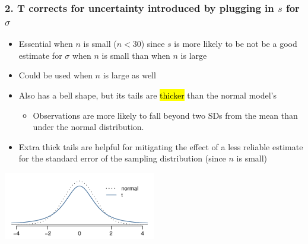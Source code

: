\documentclass[slidestop,compress,mathserif,12pt,t,professionalfonts,xcolor=table]{beamer}
\begin{document}
\begin{frame}
\frametitle{2. T corrects for uncertainty introduced by plugging in $s$ for $\sigma$}

\begin{itemize}

\item Essential when $n$ is small ($n < 30$) since $s$ is more likely to be not be a good estimate for $\sigma$ when $n$ is small than when $n$ is large

\pause

\item Could be used when $n$ is large as well

\pause

\item Also has a bell shape, but its tails are \hl{thicker} than the normal model's
\begin{itemize}
\item Observations are more likely to fall beyond two SDs from the mean than under the normal distribution.
\end{itemize}

\pause

\item Extra thick tails are helpful for mitigating the effect of a less reliable estimate for the standard error of the sampling distribution (since $n$ is small)

\end{itemize}

\begin{center}
\includegraphics[width=0.5\textwidth]{figures/tDistCompareToNormalDist/tDistCompareToNormalDist}
\end{center}


\end{frame}
\end{document}
